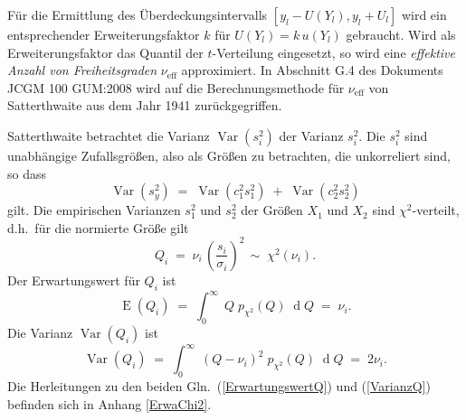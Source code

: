 Für die Ermittlung des Überdeckungsintervalls $[y_l-U(Y_l), y_l+U_l]$ wird ein entsprechender
Erweiterungsfaktor $k$ für $U(Y_l) = k \, u(Y_l)$ gebraucht. Wird als Erweiterungsfaktor das
Quantil der $t$-Verteilung eingesetzt, so wird eine \textsl{effektive Anzahl
von Freiheitsgraden} $\nu_\mathrm{eff}$ approximiert.
In Abschnitt G.4 des Dokuments JCGM 100 GUM:2008 wird auf die Berechnungsmethode
für $\nu_\mathrm{eff}$ von Satterthwaite aus dem Jahr 1941 \cite{Sat41} zurückgegriffen.

Satterthwaite betrachtet die Varianz $\operatorname{Var}(s_i^2)$
der Varianz $s_i^2$. Die $s_i^2$ sind unabhängige
Zufallsgrößen, also als Größen zu betrachten, die unkorreliert sind, so dass
\begin{equation}
\operatorname{Var}(s_y^2) \; = \;  \operatorname{Var}\left( c_1^2 s_1^2 \right)
 \; + \; \operatorname{Var}\left( c_2^2 s_2^2 \right)
\label{VarianzvarianzSumme}
\end{equation}
gilt.
Die empirischen Varianzen $s_1^2$ und $s_2^2$ der Größen $X_1$ und $X_2$ sind $\chi^2$-verteilt,
d.h.\ für die normierte Größe gilt
\begin{equation}
Q_i \; = \; \nu_i \, \left(\frac{s_i}{\sigma_i}\right)^2 \, \sim \; \chi^2(\nu_i) .
\end{equation}
Der Erwartungswert für $Q_i$ ist
\begin{equation}
\operatorname{E}(Q_i) \; = \; \int_0^\infty \; Q \; p_{\chi^2}(Q) \; \operatorname{d}Q \; = \; \nu_i.
\label{ErwartungswertQ}
\end{equation}
Die Varianz $\operatorname{Var}(Q_i)$ ist
\begin{equation}
\operatorname{Var}(Q_i) \; = \; \int_0^\infty \; (Q - \nu_i)^2 \; p_{\chi^2}(Q) \; \operatorname{d}Q \; = \; 2 \nu_i.
\label{VarianzQ}
\end{equation}
Die Herleitungen zu den beiden Gln.~(\ref{ErwartungswertQ}) und (\ref{VarianzQ})
befinden sich in Anhang \ref{ErwaChi2}.

